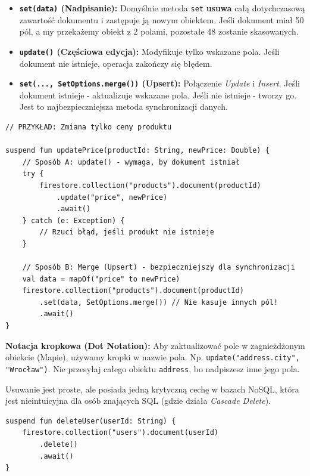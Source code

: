 \begin{itemize}
    \item \textbf{\texttt{set(data)} (Nadpisanie):}
    Domyślnie metoda \texttt{set} \textbf{usuwa} całą dotychczasową zawartość dokumentu i zastępuje ją nowym obiektem. Jeśli dokument miał 50 pól, a my przekażemy obiekt z 2 polami, pozostałe 48 zostanie skasowanych.
    
    \item \textbf{\texttt{update()} (Częściowa edycja):}
    Modyfikuje tylko wskazane pola. Jeśli dokument nie istnieje, operacja zakończy się błędem.
    
    \item \textbf{\texttt{set(..., SetOptions.merge())} (Upsert):}
    Połączenie \textit{Update} i \textit{Insert}. Jeśli dokument istnieje - aktualizuje wskazane pola. Jeśli nie istnieje - tworzy go. Jest to najbezpieczniejsza metoda synchronizacji danych.
\end{itemize}

\begin{verbatim}
// PRZYKŁAD: Zmiana tylko ceny produktu

suspend fun updatePrice(productId: String, newPrice: Double) {
    // Sposób A: update() - wymaga, by dokument istniał
    try {
        firestore.collection("products").document(productId)
            .update("price", newPrice)
            .await()
    } catch (e: Exception) {
        // Rzuci błąd, jeśli produkt nie istnieje
    }

    // Sposób B: Merge (Upsert) - bezpieczniejszy dla synchronizacji
    val data = mapOf("price" to newPrice)
    firestore.collection("products").document(productId)
        .set(data, SetOptions.merge()) // Nie kasuje innych pól!
        .await()
}
\end{verbatim}

\textbf{Notacja kropkowa (Dot Notation):} Aby zaktualizować pole w zagnieżdżonym obiekcie (Mapie), używamy kropki w nazwie pola. Np. \texttt{update("address.city", "Wrocław")}. Nie przesyłaj całego obiektu \texttt{address}, bo nadpiszesz inne jego pola.

Usuwanie jest proste, ale posiada jedną krytyczną cechę w bazach NoSQL, która jest nieintuicyjna dla osób znających SQL (gdzie działa \textit{Cascade Delete}).

\begin{verbatim}
suspend fun deleteUser(userId: String) {
    firestore.collection("users").document(userId)
        .delete()
        .await()
}
\end{verbatim}

